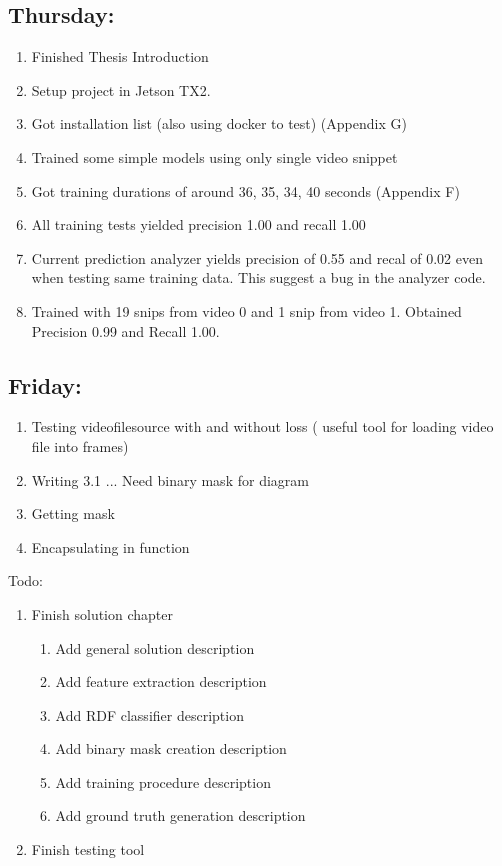 \documentclass[12pt,oneside]{book}
\begin{document}
  \subsection*{Thursday:}
  \begin{enumerate}
    \item Finished Thesis Introduction
    \item Setup project in Jetson TX2.
    \item Got installation list (also using docker to test) (Appendix G)
    \item Trained some simple models using only single video snippet
    \item Got training durations of around 36, 35, 34, 40 seconds (Appendix F)
    \item All training tests yielded precision 1.00 and recall 1.00
    \item Current prediction analyzer yields precision of 0.55 and recal of 0.02 even when testing same training data. This suggest a bug in the analyzer code.
    \item Trained with 19 snips from video 0 and 1 snip from video 1. Obtained Precision 0.99 and Recall 1.00.
  \end{enumerate}

  \subsection*{Friday:}

  \begin{enumerate}
    \item Testing videofilesource with and without loss (
      useful tool for loading video file into frames)
    \item Writing 3.1 ... Need binary mask for diagram
    \item Getting mask
    \item Encapsulating in function
  \end{enumerate}

  Todo:
  \begin{enumerate}
    \item Finish solution chapter
    \begin{enumerate}
      \item Add general solution description
      \item Add feature extraction description
      \item Add RDF classifier description
      \item Add binary mask creation description
      \item Add training procedure description
      \item Add ground truth generation description
    \end{enumerate}
    \item Finish testing tool
  \end{enumerate}
\end{document}
